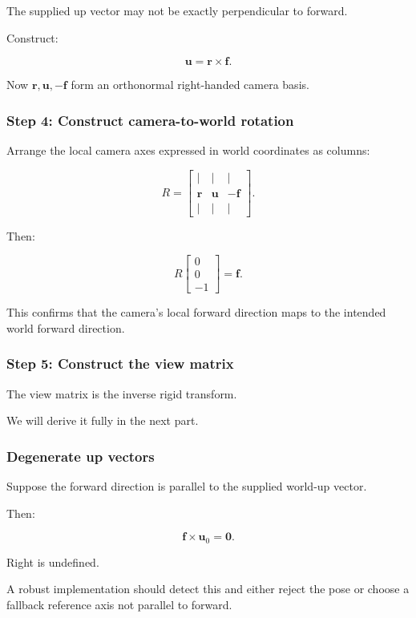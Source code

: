 The supplied up vector may not be exactly perpendicular to forward.

Construct:

\[
 \boxed{ \mathbf u=\mathbf r\times\mathbf f }.
\]

Now \(\mathbf r,\mathbf u,-\mathbf f\) form an orthonormal right-handed camera basis.

\subsubsection{Step 4: Construct camera-to-world rotation}\label{step-4-construct-camera-to-world-rotation}

Arrange the local camera axes expressed in world coordinates as columns:

\[
 \boxed{ R= \begin{bmatrix} |&|&|\\ \mathbf r&\mathbf u&-\mathbf f\\ |&|&| \end{bmatrix} }.
\]

Then:

\[
 R \begin{bmatrix}0\\0\\-1\end{bmatrix} = \mathbf f.
\]

This confirms that the camera's local forward direction maps to the intended world forward direction.

\subsubsection{Step 5: Construct the view matrix}\label{step-5-construct-the-view-matrix}

The view matrix is the inverse rigid transform.

We will derive it fully in the next part.

\subsubsection{Degenerate up vectors}\label{degenerate-up-vectors}

Suppose the forward direction is parallel to the supplied world-up vector.

Then:

\[
 \mathbf f\times\mathbf u_0=\mathbf0.
\]

Right is undefined.

A robust implementation should detect this and either reject the pose or choose a fallback reference axis not parallel to forward.

